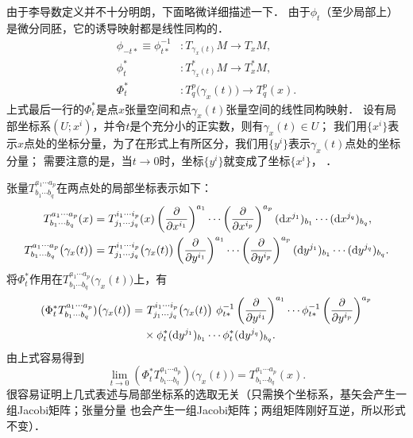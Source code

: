 由于李导数定义并不十分明朗，下面略微详细描述一下．
由于$\phi_t$（至少局部上）是微分同胚，它的诱导映射都是线性同构的．
\begin{align}
    \phi_{-t*} \equiv \phi_{t*} ^{-1} &: T_{\gamma_x(t)}M \to T_x M , \\
    \phi_{t}^{*} &: T_{\gamma_x(t)}^{*}M \to T_x^{*} M , \\
    \Phi_{t}^{*} &: T_q^p\bigl({\gamma_x(t)}\bigr) \to T_q^p(x) .
\end{align}
上式最后一行的$\Phi_t^{*}$是点$x$张量空间和点$\gamma_x(t)$张量空间的线性同构映射．
设有局部坐标系$(U;x^i)$，并令$t$是个充分小的正实数，则有$\gamma_x(t)\in U$；
我们用$\{x^i\}$表示$x$点处的坐标分量，为了在形式上有所区分，我们用$\{y^i\}$表示$\gamma_x(t)$点处的坐标分量；
需要注意的是，当$t\to 0$时，坐标$\{y^i\}$就变成了坐标$\{x^i\}$，
．

张量$T^{a_1 \cdots a_p}_{b_1\cdots b_q} $在两点处的局部坐标表示如下：
\begin{align*}
    T^{a_1 \cdots a_p}_{b_1\cdots b_q}(x) & = T^{i_1 \cdots i_p}_{j_1\cdots j_q} (x)
    \left(\frac{\partial }{\partial x^{i_1}}\right)^{a_1} \cdots 
    \left(\frac{\partial }{\partial x^{i_p}}\right)^{a_p} 
    ({\rm d}x^{j_1})_{b_1} \cdots  ({\rm d}x^{j_q})_{b_q}    ,\\
    T^{a_1 \cdots a_p}_{b_1\cdots b_q}\bigl(\gamma_x(t)\bigr) 
    & = T^{i_1 \cdots i_p}_{j_1\cdots j_q}\bigl(\gamma_x(t)\bigr)
    \left(\frac{\partial }{\partial y^{i_1}}\right)^{a_1} \cdots 
    \left(\frac{\partial }{\partial y^{i_p}}\right)^{a_p} 
    ({\rm d}y^{j_1})_{b_1} \cdots  ({\rm d}y^{j_q})_{b_q}    .
\end{align*}
将$\Phi_t^*$作用在$T^{a_1 \cdots a_p}_{b_1\cdots b_q}\bigl(\gamma_x(t)\bigr)$上，有
\begin{equation}\label{chdm:eqn_tmp501}
\begin{aligned}
    (\Phi_t^* T^{a_1 \cdots a_p}_{b_1\cdots b_q})\bigl(\gamma_x(t)\bigr) 
     =& \ T^{i_1 \cdots i_p}_{j_1\cdots j_q}\bigl(\gamma_x(t)\bigr) \ 
    \phi_{t*} ^{-1}  \left(\frac{\partial }{\partial y^{i_1}}\right)^{a_1} \cdots 
    \phi_{t*} ^{-1} \left(\frac{\partial }{\partial y^{i_p}}\right)^{a_p} \\
    & \times \phi_{t}^{*}({\rm d}y^{j_1})_{b_1} \cdots \phi_{t}^{*} ({\rm d}y^{j_q})_{b_q}  .
\end{aligned}
\end{equation}
由上式容易得到
\begin{equation}
    \lim_{t\to 0}(\Phi_t^* T^{a_1 \cdots a_p}_{b_1\cdots b_q})\bigl(\gamma_x(t)\bigr)
    =T^{a_1 \cdots a_p}_{b_1\cdots b_q}(x).
\end{equation}
很容易证明上几式表述与局部坐标系的选取无关（只需换个坐标系，基矢会产生一组Jacobi矩阵；张量分量
也会产生一组Jacobi矩阵；两组矩阵刚好互逆，所以形式不变）．

